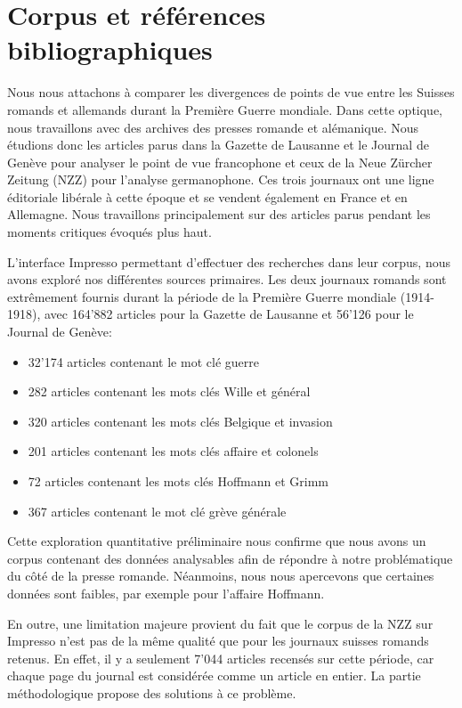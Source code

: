 \documentclass[french,a4paper]{article}
\begin{document}
\section*{Corpus et références bibliographiques}

Nous nous attachons à comparer les divergences de points de vue entre les Suisses romands et allemands durant la Première Guerre mondiale.
Dans cette optique, nous travaillons avec des archives des presses romande et alémanique.
Nous étudions donc les articles parus dans la Gazette de Lausanne et le Journal de Genève pour analyser le point de vue francophone et ceux de la Neue Zürcher Zeitung (NZZ) pour l’analyse germanophone.
Ces trois journaux ont une ligne éditoriale libérale \cite{clavien} à cette époque et se vendent également en France et en Allemagne.
Nous travaillons principalement sur des articles parus pendant les moments critiques évoqués plus haut.

L'interface Impresso permettant d'effectuer des recherches dans leur corpus, nous avons exploré nos différentes sources primaires.
Les deux journaux romands sont extrêmement fournis durant la période de la Première Guerre mondiale (1914-1918), avec 164'882 articles pour la Gazette de Lausanne et 56'126 pour le Journal de Genève:
 
\begin{itemize}
    \item 32'174 articles contenant le mot clé \og guerre \fg{}
    \item 282 articles contenant les mots clés \og Wille \fg{} et \og général \fg{}
    \item 320 articles contenant les mots clés \og Belgique \fg{} et \og invasion \fg{}
    \item 201 articles contenant les mots clés \og affaire \fg{} et \og colonels \fg{}
    \item 72 articles contenant les mots clés \og Hoffmann \fg{} et \og Grimm \fg{}
    \item 367 articles contenant le mot clé \og grève générale \fg{}
\end{itemize}

Cette exploration quantitative préliminaire nous confirme que nous avons un corpus contenant des données analysables afin de répondre à notre problématique du côté de la presse romande.
Néanmoins, nous nous apercevons que certaines données sont faibles, par exemple pour l'affaire Hoffmann.

En outre, une limitation majeure provient du fait que le corpus de la NZZ sur Impresso n'est pas de la même qualité que pour les journaux suisses romands retenus.
En effet, il y a seulement 7'044 articles recensés sur cette période, car chaque page du journal est considérée comme un article en entier.
La partie méthodologique propose des solutions à ce problème.
\end{document}

